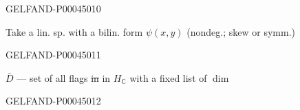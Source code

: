 \begin{GelfandAdjacentEvidence}{GELFAND-P000450}{10}


Take a lin. sp.  with a bilin. form $\psi(x,y)$
(nondeg.; skew or symm.)
\end{GelfandAdjacentEvidence}
\begin{GelfandAdjacentEvidence}{GELFAND-P000450}{11}


$\bar D$ — set of all flags \sout{in} in $H_{\mathbb C}$
with a fixed list of $\dim$
\end{GelfandAdjacentEvidence}
\begin{GelfandAdjacentEvidence}{GELFAND-P000450}{12}

\end{GelfandAdjacentEvidence}



